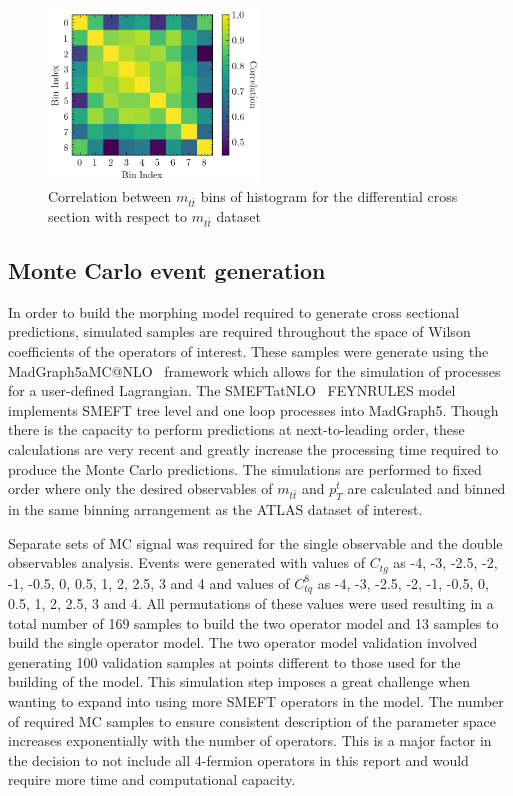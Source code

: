 \documentclass[a4paper,11pt]{article}
\begin{document}
\begin{figure}[htb]
    \centering
    \includegraphics[width=0.5\textwidth]{plots/correlation.png}
    \caption{Correlation between $m_{t\bar{t}}$ bins of histogram for the differential cross section with respect to $m_{t\bar{t}}$ dataset}
    \label{fig:correlation}
\end{figure}

\subsection{Monte Carlo event generation}
In order to build the morphing model required to generate cross sectional predictions, simulated samples are required throughout the space of Wilson coefficients of the operators of interest.
These samples were generate using the MadGraph5\textunderscore aMC@NLO~\cite{Alwall_2014} framework which allows for the simulation of processes for a user-defined Lagrangian.
The SMEFTatNLO~\cite{degrande2020automated} FEYNRULES model implements SMEFT tree level and one loop processes into MadGraph5.
Though there is the capacity to perform predictions at next-to-leading order, these calculations are very recent  and greatly increase the processing time required to produce the Monte Carlo predictions.
The simulations are performed to fixed order where only the desired observables of $m_{t\bar{t}}$ and ${p_{T}^{t}}$ are calculated and binned in the same binning arrangement as the ATLAS dataset of interest.

Separate sets of MC signal was required for the single observable and the double observables analysis.
Events were generated with values of $C_{tg}$ as -4, -3, -2.5, -2, -1, -0.5, 0, 0.5, 1, 2, 2.5, 3 and 4 and values of $C_{tq}^{8}$ as -4, -3, -2.5, -2, -1, -0.5, 0, 0.5, 1, 2, 2.5, 3 and 4. 
All permutations of these values were used resulting in a total number of 169 samples to build the two operator model and 13 samples to build the single operator model.
The two operator model validation involved generating 100 validation samples at points different to those used for the building of the model.
This simulation step imposes a great challenge when wanting to expand into using more SMEFT operators in the model.
The number of required MC samples to ensure consistent description of the parameter space increases exponentially with the number of operators.
This is a major factor in the decision to not include all 4-fermion operators in this report and would require more time and computational capacity.
\end{document}
